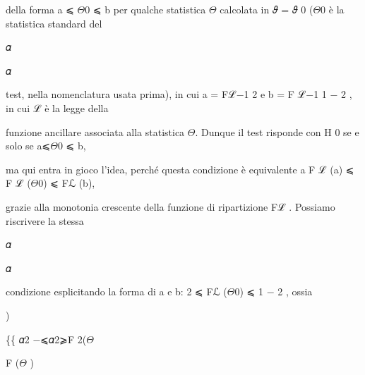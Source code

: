 \documentclass[a4paper,portrait,12pt]{article}
\begin{document}
\begin{flushleft}
della forma a ⩽ $\Theta$0 ⩽ b per qualche statistica $\Theta$ calcolata in 𝜗 = 𝜗 0 ($\Theta$0 \`{e} la statistica standard del
\end{flushleft}


\begin{flushleft}
𝛼
\end{flushleft}


\begin{flushleft}
𝛼
\end{flushleft}


\begin{flushleft}
test, nella nomenclatura usata prima), in cui a = Fℒ$-$1 2 e b = F ℒ$-$1 1 $-$ 2 , in cui ℒ \`{e} la legge della
\end{flushleft}


\begin{flushleft}
funzione ancillare associata alla statistica $\Theta$. Dunque il test risponde con H 0 se e solo se a⩽$\Theta$0 ⩽ b,
\end{flushleft}


\begin{flushleft}
ma qui entra in gioco l'idea, perch\'{e} questa condizione \`{e} equivalente a F ℒ (a) ⩽ F ℒ ($\Theta$0) ⩽ Fℒ (b),
\end{flushleft}


\begin{flushleft}
grazie alla monotonia crescente della funzione di ripartizione Fℒ . Possiamo riscrivere la stessa
\end{flushleft}


\begin{flushleft}
𝛼
\end{flushleft}


\begin{flushleft}
𝛼
\end{flushleft}


\begin{flushleft}
condizione esplicitando la forma di a e b: 2 ⩽ Fℒ ($\Theta$0) ⩽ 1 $-$ 2 , ossia
\end{flushleft}


)


\begin{flushleft}
\{\{ 𝛼2 $-$⩽𝛼2⩾F 2($\Theta$
\end{flushleft}


\begin{flushleft}
F ($\Theta$ )
\end{flushleft}
\end{document}
